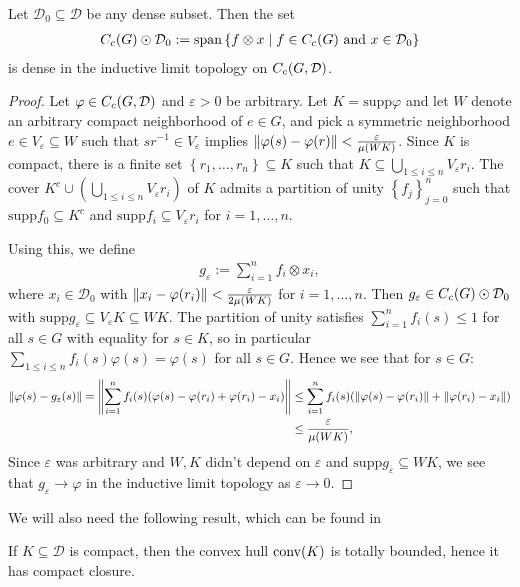 \begin{lemma}
Let $\mathcal{D}_0 \subseteq \mathcal{D}$ be any dense subset. Then the set
\begin{align*}
C_c(G) \odot \mathcal{D}_0 := \mathrm{span}\left\{ f \otimes x \mid f \in C_c(G) \text{ and } x \in \mathcal{D}_0 \right\} 
\end{align*}
is dense in the inductive limit topology on $C_c(G,\mathcal{D})$.
\label{int:indlmdense}
\end{lemma}
\begin{proof}	
Let $\varphi \in C_c(G,\mathcal{D})$ and $\varepsilon > 0$ be arbitrary. Let $K= \mathrm{supp} \varphi$ and let $W$ denote an arbitrary compact neighborhood of $e \in G$, and pick a symmetric neighborhood $e \in V_{\varepsilon} \subseteq W$ such that $sr^{-1} \in V_\varepsilon$ implies $\left\lVert \varphi(s) - \varphi(r) \right\rVert < \frac{\varepsilon}{\mu(WK)}$. Since $K$ is compact, there is a finite set $\left\{ r_1,\dots,r_n \right\} \subseteq K$ such that $K \subseteq \bigcup_{1 \leq i \leq n} V_\varepsilon r_i$. The cover $K^c \cup \left( \bigcup_{1 \leq i \leq n } V_\varepsilon r_i \right)$ of $K$ admits a partition of unity $\left\{ f_j \right\}_{j=0}^n$ such that $\mathrm{supp}f_0 \subseteq K^c$ and $\mathrm{supp}f_i \subseteq V_\varepsilon r_i$ for $i = 1 ,\dots,n$. 

Using this, we define
\begin{align*}
	g_\varepsilon := \sum_{i=1}^n f_i \otimes x_i,
\end{align*}
where $x_i \in \mathcal{D}_0$ with $\left\lVert x_i - \varphi(r_i)\right\rVert < \frac{\varepsilon}{2\mu(WK)}$ for $i = 1,\dots,n$. Then $g_\varepsilon \in C_c(G) \odot \mathcal{D}_0$ with $\mathrm{supp} g_\varepsilon \subseteq V_\varepsilon K \subseteq W K$. The partition of unity satisfies $\sum_{i=1}^n f_i(s) \leq 1$ for all $s \in G$ with equality for $s \in K$, so in particular $\sum_{1 \leq i \leq n}f_i(s) \varphi(s) = \varphi(s)$ for all $s \in G$. Hence we see that for $s \in G$: 
\begin{align*}
	\left\lVert\varphi(s) - g_{\varepsilon}(s)\right\rVert = \left\lVert \sum_{i=1}^n f_i(s)(\varphi(s) - \varphi(r_i)+\varphi(r_i)-x_i)\right\rVert &\leq \sum_{i=1}^n f_i(s) (\left\lVert \varphi(s) - \varphi(r_i)\right\rVert+\left\lVert \varphi(r_i)-x_i\right\rVert) \\
	&\leq \frac{\varepsilon}{\mu(WK)},
\end{align*}
Since $\varepsilon$ was arbitrary and $W,K$ didn't depend on $\varepsilon$ and $ \mathrm{supp} g_\varepsilon \subseteq WK$, we see that $g_\varepsilon \to \varphi$ in the inductive limit topology as $\varepsilon \to 0$.
\end{proof}
We will also need the following result, which can be found in \cite[Theorem 3.20, part (b, c)]{rudin1991functional}
\begin{lemma}
	If $K \subseteq \mathcal{D}$ is compact, then the convex hull $\operatorname{conv}(K)$ is totally bounded, hence it has compact closure.
\label{int:clconvcomp}
\end{lemma}

